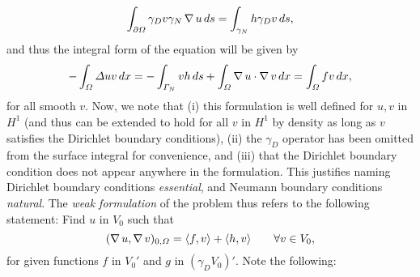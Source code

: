 \begin{equation*}
    \int_{\partial\Omega}\gamma_D v \gamma_N \operatorname{\nabla} u\,ds = \int_{\gamma_N} h \gamma_D v\,ds,
\end{equation*}
and thus the integral form of the equation will be given by
\begin{equation*}
    -\int_\Omega\Delta u v\,dx = -\int_{\Gamma_N}v h\,ds + \int_\Omega \operatorname{\nabla} u \cdot \operatorname{\nabla} v\,dx = \int_\Omega f v\,dx,
\end{equation*}
for all smooth $v$. Now, we note that (i) this formulation is well defined for $u,v$ in $H^1$ (and thus can be extended to hold for all $v$ in $H^1$ by density as long as $v$ satisfies the Dirichlet boundary conditions), (ii) the $\gamma_D$ operator has been omitted from the surface integral for convenience, and (iii) that the Dirichlet boundary condition does not appear anywhere in the formulation. This justifies naming Dirichlet boundary conditions \emph{essential}, and Neumann boundary conditions \emph{natural}. The \emph{weak formulation} of the problem thus refers to the following statement: Find $u$ in $V_0$ such that
\begin{equation}\label{eq:weak-form-poisson}
    (\operatorname{\nabla} u, \operatorname{\nabla} v)_{0,\Omega} = \langle f, v\rangle  + \langle h,  v\rangle \qquad \forall v\in V_0,
\end{equation}
for given functions $f$ in $V_0'$ and $g$ in $(\gamma_D V_0)'$. Note the following: 
